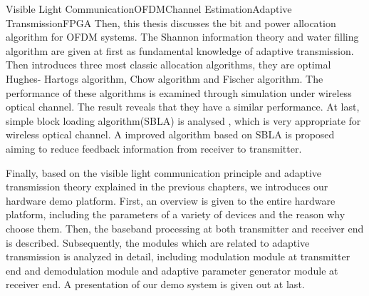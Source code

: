 \begin{englishabstract}{Visible Light Communication\quad{}OFDM\quad{}Channel Estimation\quad{}Adaptive Transmission\quad{}FPGA}
Then, this thesis discusses the bit and power allocation algorithm for OFDM systems. The Shannon information theory and water filling algorithm are given at first as fundamental knowledge of adaptive transmission. Then introduces three most classic allocation algorithms, they are optimal Hughes- Hartogs algorithm, Chow algorithm and Fischer algorithm. The performance of these algorithms is examined through simulation under wireless optical channel. The result reveals that they have a similar performance. At last, simple block loading algorithm(SBLA) is analysed , which is very appropriate for wireless optical channel. A improved algorithm based on SBLA is proposed aiming to reduce feedback information from receiver to transmitter.

Finally, based on the visible light communication principle and adaptive transmission theory explained in the previous chapters, we introduces our  hardware demo platform. First, an overview is given to the entire hardware platform, including the parameters of a variety of devices and the reason why choose them. Then, the baseband processing at both transmitter and receiver end is described. Subsequently, the modules which are related to adaptive transmission is analyzed in detail, including modulation module at transmitter end and demodulation module and adaptive parameter generator module at receiver end. A presentation of our demo system is given out at last.

\end{englishabstract}
